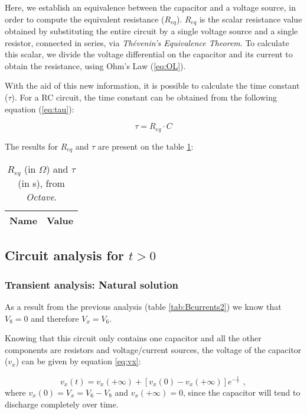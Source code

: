 Here, we establish an equivalence between the capacitor and a voltage source, in order to compute the equivalent resistance ($R_{eq}$). $R_{eq}$ is the scalar resistance value obtained by substituting the entire circuit by a single voltage source and a single resistor, connected in series, via \emph{Thévenin's Equivalence Theorem}. To calculate this scalar, we divide the voltage differential on the capacitor and its current to obtain the resistance, using Ohm's Law (\ref{eq:OL}).

With the aid of this new information, it is possible to calculate the time constant ($\tau$). For a RC circuit, the time constant can be obtained from the following equation (\ref{eq:tau}):

\begin{equation}
    \tau = R_{eq}\cdot C
    \label{eq:tau}
\end{equation}

The results for $R_{eq}$ and $\tau$ are present on the table \ref{tab:Req}:

\begin{table}[H]
  \centering
  \begin{tabular}{|l|r|}
    \hline    
    {\bf Name} & {\bf Value} \\ \hline
    
  \end{tabular}
  \caption{$R_{eq}$ (in $\Omega$) and $\tau$ (in s), from \textit{Octave}.}
  \label{tab:Req}
\end{table}

\subsection{Circuit analysis for $t>0$}
\subsubsection{Transient analysis: Natural solution}

As a result from the previous analysis (table \ref{tab:Bcurrents2}) we know that $V_8=0$ and therefore $V_x=V_6$.

Knowing that this circuit only contains one capacitor and all the other components are resistors and voltage/current sources, the voltage of the capacitor ($v_x$) can be given by equation \ref{eq:vx}:

\begin{equation}
    v_x(t)=v_x(+\infty)+[v_x(0)-v_x(+\infty)]e^{-\frac{t}{\tau}} \hspace{5pt},
    \label{eq:vx}
\end{equation}
where $v_x(0)=V_x=V_6-V_8$ and $v_x(+\infty)=0$, since the capacitor will tend to discharge completely over time.

